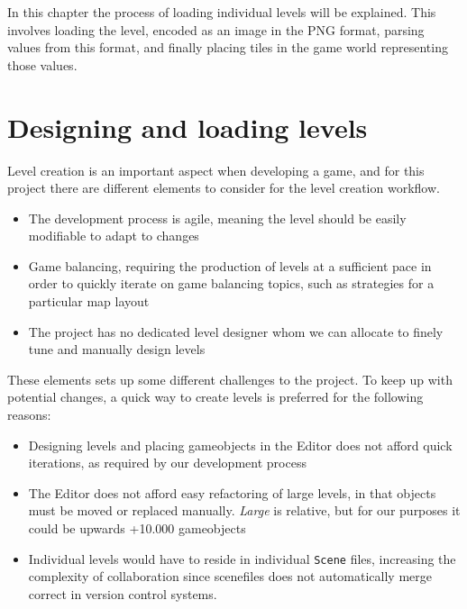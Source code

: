 In this chapter the process of loading individual levels will be explained.
This involves loading the level, encoded as an image in the PNG format, parsing values from this format, and finally placing tiles in the game world representing those values.

\section{Designing and loading levels}
Level creation is an important aspect when developing a game, and for this project there are different elements to consider for the level creation workflow.
\begin{itemize}
    \item The development process is agile, meaning the level should be easily modifiable to adapt to changes
    \item Game balancing, requiring the production of levels at a sufficient pace in order to quickly iterate on game balancing topics, such as strategies for a particular map layout
    \item The project has no dedicated level designer whom we can allocate to finely tune and manually design levels
\end{itemize}
These elements sets up some different challenges to the project.
To keep up with potential changes, a quick way to create levels is preferred for the following reasons:
\begin{itemize}
    \item Designing levels and placing gameobjects in the Editor does not afford quick iterations, as required by our development process
    \item The Editor does not afford easy refactoring of large levels, in that objects must be moved or replaced manually. \textit{Large} is relative, but for our purposes it could be upwards +10.000 gameobjects
    \item Individual levels would have to reside in individual \texttt{Scene} files, increasing the complexity of collaboration since scenefiles does not  automatically merge correct in version control systems.
\end{itemize}

